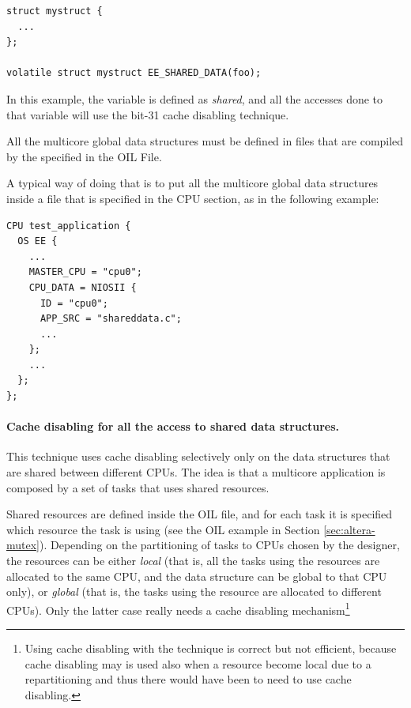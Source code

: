 \begin{lstlisting}
struct mystruct {
  ...
};

volatile struct mystruct EE_SHARED_DATA(foo);    
\end{lstlisting}

In this example, the  variable is defined as {\em shared}, and
all the accesses done to that variable will use the bit-31 cache
disabling technique.

\begin{warning}
All the multicore global data structures must be defined in files
that are compiled by the  specified in the OIL File.

A typical way of doing that is to put all the multicore global
data structures inside a file that is specified in the
 CPU section, as in the following example:

\begin{lstlisting}
CPU test_application {
  OS EE {
    ...
    MASTER_CPU = "cpu0";			
    CPU_DATA = NIOSII {
      ID = "cpu0";
      APP_SRC = "shareddata.c";
      ...
    };
    ...
  };
};
\end{lstlisting}
\end{warning}



\paragraph{Cache disabling for all the access to shared data structures.}

This technique uses cache disabling selectively only on the data
structures that are shared between different CPUs. The idea is that a
multicore application is composed by a set of tasks that uses
shared resources. 

Shared resources are defined inside the OIL file, and for each task it
is specified which resource the task is using (see the OIL example in
Section \ref{sec:altera-mutex}).  Depending on the partitioning of
tasks to CPUs chosen by the designer, the resources can be either {\em
local} (that is, all the tasks using the resources are allocated to
the same CPU, and the data structure can be global to that CPU only),
or {\em global} (that is, the tasks using the resource are allocated
to different CPUs). Only the latter case really needs a cache
disabling mechanism\footnote{Using cache disabling with the
 technique is correct but not efficient, because
cache disabling may is used also when a resource become local due to a
repartitioning and thus there would have been to need to use cache
disabling.}

